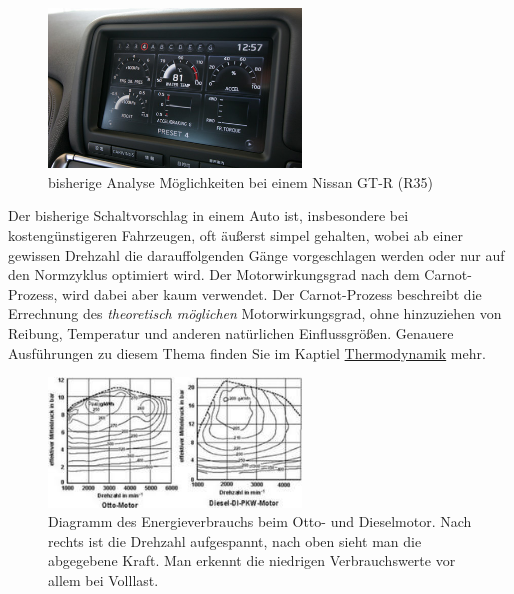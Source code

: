 \begin{figure}[!htb]\centering
	\includegraphics[width=0.6\textwidth]{images/gtrMultifunc}
	\caption{bisherige Analyse Möglichkeiten bei einem Nissan GT-R (R35) \cite{SIMR.CH1-Fahrstil-Analyse.GTRMultifunc}}\label{Fig:imgGTR}
\end{figure}

\newpage
Der bisherige Schaltvorschlag in einem Auto ist, insbesondere bei kostengünstigeren Fahrzeugen, oft äußerst simpel gehalten, wobei ab einer gewissen Drehzahl die darauffolgenden Gänge vorgeschlagen werden oder nur auf den Normzyklus optimiert wird. \cite{SIMR.CH1-Fahrstil-Analyse.Schaltempfehlung} Der Motorwirkungsgrad nach dem Carnot-Prozess, wird dabei aber kaum verwendet. Der Carnot-Prozess beschreibt die Errechnung des \textit{theoretisch möglichen} Motorwirkungsgrad, ohne hinzuziehen von Reibung, Temperatur und anderen natürlichen Einflussgrößen. \cite{SIMR.CH1-Fahrstil-Analyse.CarnotWirkungsgrad} Genauere Ausführungen zu diesem Thema finden Sie im Kaptiel \hyperlink{subsubsection.2.1.2}{Thermodynamik}  mehr. 

\begin{figure}[!htb]\centering
	\includegraphics[width=0.6\textwidth]{images/motorkennfeld}
	\caption{Diagramm des Energieverbrauchs beim Otto- und Dieselmotor. Nach rechts ist die Drehzahl aufgespannt, nach oben sieht man die abgegebene Kraft. Man erkennt die niedrigen Verbrauchswerte vor allem bei Volllast. \cite{SIMR.CH1-Fahrstil-Analyse.Motorkennfeld}}\label{Fig:imgMotorkennfeld}
\end{figure}

